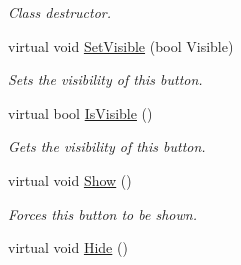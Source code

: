 \begin{DoxyCompactItemize}
\begin{DoxyCompactList}\small\item\em Class destructor. \item\end{DoxyCompactList}\item 
virtual void \hyperlink{classphys_1_1UI_1_1TextButton_a07e030ef92f314b1eff663cbc1712d42}{SetVisible} (bool Visible)
\begin{DoxyCompactList}\small\item\em Sets the visibility of this button. \item\end{DoxyCompactList}\item 
virtual bool \hyperlink{classphys_1_1UI_1_1TextButton_a505167a00d343d704df1f759cd12ed1e}{IsVisible} ()
\begin{DoxyCompactList}\small\item\em Gets the visibility of this button. \item\end{DoxyCompactList}\item 
\hypertarget{classphys_1_1UI_1_1TextButton_add95c812af6ef7584a2d515a33bac72b}{
virtual void \hyperlink{classphys_1_1UI_1_1TextButton_add95c812af6ef7584a2d515a33bac72b}{Show} ()}
\label{classphys_1_1UI_1_1TextButton_add95c812af6ef7584a2d515a33bac72b}

\begin{DoxyCompactList}\small\item\em Forces this button to be shown. \item\end{DoxyCompactList}\item 
\hypertarget{classphys_1_1UI_1_1TextButton_aef823890ba8c829183f1b618473c1bac}{
virtual void \hyperlink{classphys_1_1UI_1_1TextButton_aef823890ba8c829183f1b618473c1bac}{Hide} ()}
\label{classphys_1_1UI_1_1TextButton_aef823890ba8c829183f1b618473c1bac}


\end{DoxyCompactItemize}
